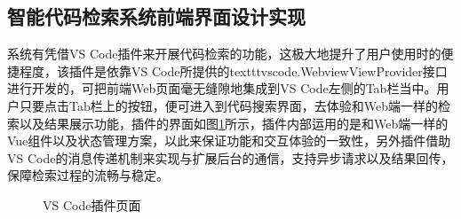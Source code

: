 \documentclass[UTF8,a4paper,12pt]{ctexart}
\numberwithin{equation}{section}
\begin{document}
\subsection{智能代码检索系统前端界面设计实现}
系统有凭借VS Code插件来开展代码检索的功能，这极大地提升了用户使用时的便捷程度，该插件是依靠VS Code所提供的texttt{vscode.WebviewViewProvider}接口进行开发的，可把前端Web页面毫无缝隙地集成到VS Code左侧的Tab栏当中。用户只要点击Tab栏上的按钮，便可进入到代码搜索界面，去体验和Web端一样的检索以及结果展示功能，插件的界面如图\ref{vscode}所示，插件内部运用的是和Web端一样的Vue组件以及状态管理方案，以此来保证功能和交互体验的一致性，另外插件借助VS Code的消息传递机制来实现与扩展后台的通信，支持异步请求以及结果回传，保障检索过程的流畅与稳定。
\begin{figure}[H]
	\caption{VS Code插件页面}
	\label{vscode}
\end{figure}
\end{document}
